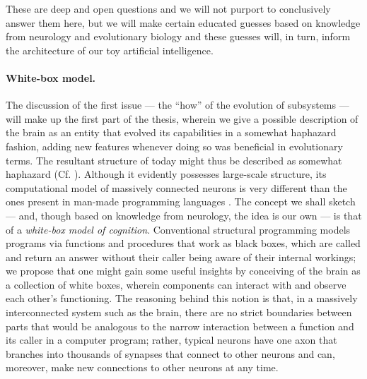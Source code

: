 These are deep and open questions and we will not purport to conclusively answer them here, but we will make certain educated guesses based on knowledge from neurology and evolutionary biology and these guesses will, in turn, inform the architecture of our toy artificial intelligence.

\paragraph{White-box model.} The discussion of the first issue --- the ``how'' of the evolution of subsystems --- will make up the first part of the thesis, wherein we give a possible description of the brain as an entity that evolved its capabilities in a somewhat haphazard fashion, adding new features whenever doing so was beneficial in evolutionary terms. The resultant structure of today might thus be described as somewhat haphazard (Cf. \cite[Section ``Mammalian Brain Regions'']{handbookBrainTheory}). Although it evidently possesses large-scale structure, its computational model of massively connected neurons is very different than the ones present in man-made programming languages \cite[Section ``Introducing the Neuron'']{handbookBrainTheory}. The concept we shall sketch --- and, though based on knowledge from neurology, the idea is our own --- is that of a \emph{white-box model of cognition}. Conventional structural programming models programs via functions and procedures that work as black boxes, which are called and return an answer without their caller being aware of their internal workings; we propose that one might gain some useful insights by conceiving of the brain as a collection of white boxes, wherein components can interact with and observe each other's functioning. The reasoning behind this notion is that, in a massively interconnected system such as the brain, there are no strict boundaries between parts that would be analogous to the narrow interaction between a function and its caller in a computer program; rather, typical neurons have one axon that branches into thousands of synapses that connect to other neurons \cite[p.\ 4]{handbookBrainTheory} and can, moreover, make new connections to other neurons at any time.

